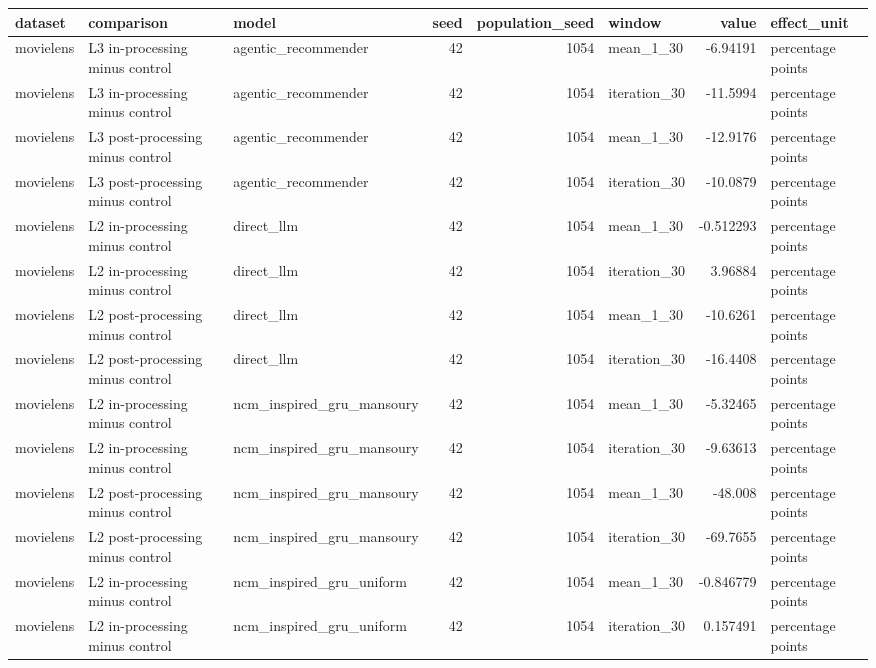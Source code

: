 \begin{table}[htbp!]
\centering
\small
\setlength{\tabcolsep}{3pt}
\renewcommand{\arraystretch}{1.1}
\begin{tabular}{lllrrlrl}
\hline
dataset & comparison & model & seed & population\_seed & window & value & effect\_unit \\
\hline
movielens & L3 in-processing minus control & agentic\_recommender & 42 & 1054 & mean\_1\_30 & -6.94191 & percentage points \\
movielens & L3 in-processing minus control & agentic\_recommender & 42 & 1054 & iteration\_30 & -11.5994 & percentage points \\
movielens & L3 post-processing minus control & agentic\_recommender & 42 & 1054 & mean\_1\_30 & -12.9176 & percentage points \\
movielens & L3 post-processing minus control & agentic\_recommender & 42 & 1054 & iteration\_30 & -10.0879 & percentage points \\
movielens & L2 in-processing minus control & direct\_llm & 42 & 1054 & mean\_1\_30 & -0.512293 & percentage points \\
movielens & L2 in-processing minus control & direct\_llm & 42 & 1054 & iteration\_30 & 3.96884 & percentage points \\
movielens & L2 post-processing minus control & direct\_llm & 42 & 1054 & mean\_1\_30 & -10.6261 & percentage points \\
movielens & L2 post-processing minus control & direct\_llm & 42 & 1054 & iteration\_30 & -16.4408 & percentage points \\
movielens & L2 in-processing minus control & ncm\_inspired\_gru\_mansoury & 42 & 1054 & mean\_1\_30 & -5.32465 & percentage points \\
movielens & L2 in-processing minus control & ncm\_inspired\_gru\_mansoury & 42 & 1054 & iteration\_30 & -9.63613 & percentage points \\
movielens & L2 post-processing minus control & ncm\_inspired\_gru\_mansoury & 42 & 1054 & mean\_1\_30 & -48.008 & percentage points \\
movielens & L2 post-processing minus control & ncm\_inspired\_gru\_mansoury & 42 & 1054 & iteration\_30 & -69.7655 & percentage points \\
movielens & L2 in-processing minus control & ncm\_inspired\_gru\_uniform & 42 & 1054 & mean\_1\_30 & -0.846779 & percentage points \\
movielens & L2 in-processing minus control & ncm\_inspired\_gru\_uniform & 42 & 1054 & iteration\_30 & 0.157491 & percentage points \\

\end{tabular}
\end{table}
